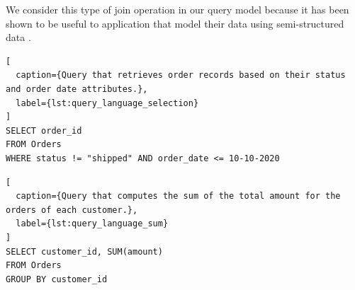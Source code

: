 \begin{itemize}
  We consider this type of join operation in our query model because it has been shown to be useful to application that
  model their data using semi-structured data \cite{mongodb:joins}.
\end{itemize}

\begin{lstlisting}[
  caption={Query that retrieves order records based on their status and order date attributes.},
  label={lst:query_language_selection}
]
SELECT order_id
FROM Orders
WHERE status != "shipped" AND order_date <= 10-10-2020
\end{lstlisting}

\begin{lstlisting}[
  caption={Query that computes the sum of the total amount for the orders of each customer.},
  label={lst:query_language_sum}
]
SELECT customer_id, SUM(amount)
FROM Orders
GROUP BY customer_id
\end{lstlisting}







